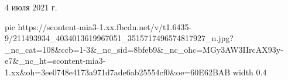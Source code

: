4 июля 2021 г.

\ifcmt
  pic https://scontent-mia3-1.xx.fbcdn.net/v/t1.6435-9/211493934_4034013619967051_3515717496574817927_n.jpg?_nc_cat=108&ccb=1-3&_nc_sid=8bfeb9&_nc_ohc=MGy3AW3IIrcAX93y-e7&_nc_ht=scontent-mia3-1.xx&oh=3ee0748e4173a971d7ade6ab25554cf0&oe=60E62BAB
  width 0.4
\fi

